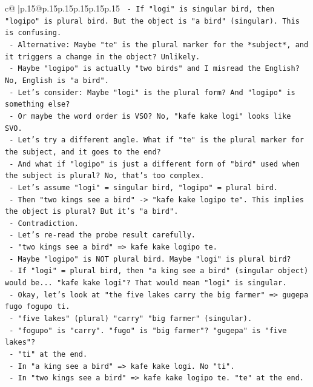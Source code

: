 \documentclass{article}
\begin{document}
{\begin{supertabular}{c@{$\;$}|p{.15\linewidth}@{}p{.15\linewidth}p{.15\linewidth}p{.15\linewidth}p{.15\linewidth}p{.15\linewidth}}
{{{\texttt{  {-} If "logi" is singular bird, then "logipo" is plural bird. But the object is "a bird" (singular). This is confusing.} \\
\texttt{  {-} Alternative: Maybe "te" is the plural marker for the *subject*, and it triggers a change in the object? Unlikely.} \\
\texttt{  {-} Maybe "logipo" is actually "two birds" and I misread the English? No, English is "a bird".} \\
\texttt{  {-} Let's consider: Maybe "logi" is the plural form? And "logipo" is something else?} \\
\texttt{  {-} Or maybe the word order is VSO? No, "kafe kake logi" looks like SVO.} \\
\texttt{  {-} Let's try a different angle. What if "te" is the plural marker for the subject, and it goes to the end?} \\
\texttt{  {-} And what if "logipo" is just a different form of "bird" used when the subject is plural? No, that's too complex.} \\
\texttt{  {-} Let's assume "logi" = singular bird, "logipo" = plural bird.} \\
\texttt{  {-} Then "two kings see a bird" {-}> "kafe kake logipo te". This implies the object is plural? But it's "a bird".} \\
\texttt{  {-} Contradiction.} \\
\texttt{  {-} Let's re{-}read the probe result carefully.} \\
\texttt{  {-} "two kings see a bird" => kafe kake logipo te.} \\
\texttt{  {-} Maybe "logipo" is NOT plural bird. Maybe "logi" is plural bird?} \\
\texttt{  {-} If "logi" = plural bird, then "a king see a bird" (singular object) would be... "kafe kake logi"? That would mean "logi" is singular.} \\
\texttt{  {-} Okay, let's look at "the five lakes carry the big farmer" => gugepa fugo fogupo ti.} \\
\texttt{  {-} "five lakes" (plural) "carry" "big farmer" (singular).} \\
\texttt{  {-} "fogupo" is "carry". "fugo" is "big farmer"? "gugepa" is "five lakes"?} \\
\texttt{  {-} "ti" at the end.} \\
\texttt{  {-} In "a king see a bird" => kafe kake logi. No "ti".} \\
\texttt{  {-} In "two kings see a bird" => kafe kake logipo te. "te" at the end.} \\
}}}
\end{supertabular}}
\end{document}
